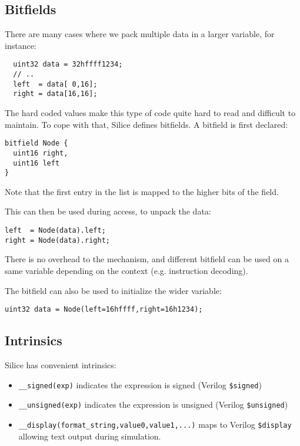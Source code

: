 \documentclass[a4]{article}
\newcommand\silice{Silice}
\begin{document}
\subsection{Bitfields}
\label{sec:bitfields}

There are many cases where we pack multiple data in a larger variable, for instance:

\begin{verbatim}
  uint32 data = 32hffff1234;
  // ..
  left  = data[ 0,16];
  right = data[16,16];
\end{verbatim}

The hard coded values make this type of code quite hard to read and difficult to maintain. To cope with that, \silice{} defines bitfields. A bitfield is first declared:

\begin{verbatim}
bitfield Node {
  uint16 right,
  uint16 left
}
\end{verbatim}

Note that the first entry in the list is mapped to the higher bits of the field.

This can then be used during access, to unpack the data:

\begin{verbatim}
left  = Node(data).left;
right = Node(data).right;
\end{verbatim}

There is no overhead to the mechanism, and different bitfield can be used on a same
variable depending on the context (e.g. instruction decoding).

The bitfield can also be used to initialize the wider variable:
\begin{verbatim}
uint32 data = Node(left=16hffff,right=16h1234);
\end{verbatim}

\subsection{Intrinsics}

\silice{} has convenient intrinsics:

\begin{itemize}
	\item \texttt{\_\_signed(exp)} indicates the expression is signed (Verilog \texttt{\$signed})
	\item \texttt{\_\_unsigned(exp)} indicates the expression is unsigned (Verilog \texttt{\$unsigned})
	\item \texttt{\_\_display(format\_string,value0,value1,...)} maps to Verilog \texttt{\$display} allowing text output during simulation.
\end{itemize}
	
\end{document}
